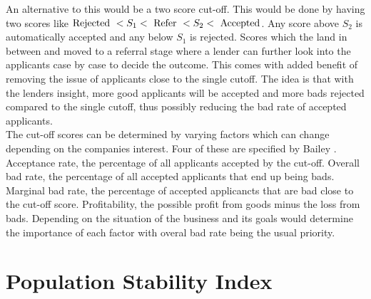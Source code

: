 An alternative to this would be a two score cut-off. This would be done by having two scores like $ \textup{Rejected } < S_{1} < \textup{ Refer } < S_{2} < \textup{ Accepted}$. Any score above $S_{2}$ is automatically accepted and any below $S_{1}$ is rejected. Scores which the land in between and moved to a referral stage where a lender can further look into the applicants case by case to decide the outcome. This comes with added benefit of removing the issue of applicants close to the single cutoff. The idea is that with the lenders insight, more good applicants will be accepted and more bads rejected compared to the single cutoff, thus possibly reducing the bad rate of accepted applicants. \\

The cut-off scores can be determined by varying factors which can change depending on the companies interest. Four of these are specified by Bailey \cite{bailey2004credit}. Acceptance rate, the percentage of all applicants accepted by the cut-off. Overall bad rate, the percentage of all accepted applicants that end up being bads. Marginal bad rate, the percentage of accepted applicancts that are bad close to the cut-off score. Profitability, the possible profit from goods minus the loss from bads. Depending on the situation of the business and its goals would determine the importance of each factor with overal bad rate being the usual priority.

\section{Population Stability Index}



%
%

